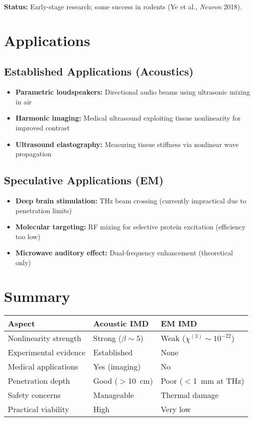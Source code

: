 \textbf{Status:} Early-stage research; some success in rodents (Ye et al., \emph{Neuron} 2018).

\section{Applications}

\subsection{Established Applications (Acoustics)}

\begin{itemize}
\item \textbf{Parametric loudspeakers:} Directional audio beams using ultrasonic mixing in air
\item \textbf{Harmonic imaging:} Medical ultrasound exploiting tissue nonlinearity for improved contrast
\item \textbf{Ultrasound elastography:} Measuring tissue stiffness via nonlinear wave propagation
\end{itemize}

\subsection{Speculative Applications (EM)}

\begin{itemize}
\item \textbf{Deep brain stimulation:} THz beam crossing (currently impractical due to penetration limits)
\item \textbf{Molecular targeting:} RF mixing for selective protein excitation (efficiency too low)
\item \textbf{Microwave auditory effect:} Dual-frequency enhancement (theoretical only)
\end{itemize}

\section{Summary}

\begin{center}
\begin{tabular}{@{}lll@{}}
\toprule
\textbf{Aspect} & \textbf{Acoustic IMD} & \textbf{EM IMD} \\
\midrule
Nonlinearity strength & Strong ($\beta \sim 5$) & Weak ($\chi^{(3)} \sim 10^{-22}$) \\
Experimental evidence & Established & None \\
Medical applications & Yes (imaging) & No \\
Penetration depth & Good ($>$10~cm) & Poor ($<$1~mm at THz) \\
Safety concerns & Manageable & Thermal damage \\
Practical viability & High & Very low \\
\bottomrule
\end{tabular}
\end{center}

